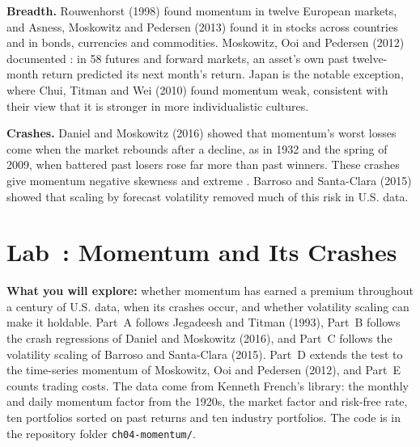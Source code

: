 \textbf{Breadth.} Rouwenhorst (1998) found momentum in twelve European markets, and Asness, Moskowitz and Pedersen (2013) found it in stocks across countries and in bonds, currencies and commodities. Moskowitz, Ooi and Pedersen (2012) documented : in 58 futures and forward markets, an asset's own past twelve-month return predicted its next month's return. Japan is the notable exception, where Chui, Titman and Wei (2010) found momentum weak, consistent with their view that it is stronger in more individualistic cultures.

\textbf{Crashes.} Daniel and Moskowitz (2016) showed that momentum's worst losses come when the market rebounds after a decline, as in 1932 and the spring of 2009, when battered past losers rose far more than past winners. These crashes give momentum negative skewness and extreme . Barroso and Santa-Clara (2015) showed that scaling by forecast volatility removed much of this risk in U.S. data.

\section{Lab~\thechapter: Momentum and Its Crashes}
\label{sec:05-lab}

\textbf{What you will explore:} whether momentum has earned a premium throughout a century of U.S. data, when its crashes occur, and whether volatility scaling can make it holdable. Part~A follows Jegadeesh and Titman (1993), Part~B follows the crash regressions of Daniel and Moskowitz (2016), and Part~C follows the volatility scaling of Barroso and Santa-Clara (2015). Part~D extends the test to the time-series momentum of Moskowitz, Ooi and Pedersen (2012), and Part~E counts trading costs. The data come from Kenneth French's library: the monthly and daily momentum factor from the 1920s, the market factor and risk-free rate, ten portfolios sorted on past returns and ten industry portfolios. The code is in the repository folder \texttt{ch04-momentum/}.

